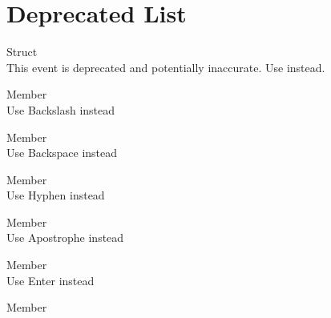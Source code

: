 \chapter{Deprecated List}
\hypertarget{deprecated}{}\label{deprecated}

\begin{DoxyRefList}
\item[Struct \doxylink{structsf_1_1_event_1_1_mouse_wheel_event}{sf\+::Event\+::Mouse\+Wheel\+Event} ]\hfill \\
\label{deprecated__deprecated000018}%
%
This event is deprecated and potentially inaccurate. Use  instead. 
\item[Member \doxylink{classsf_1_1_keyboard_acb4cacd7cc5802dec45724cf3314a142a536df84e73859aa44e11e192459470b6}{sf\+::Keyboard\+::Back\+Slash} ]\hfill \\
\label{deprecated__deprecated000022}%
%
Use Backslash instead  
\item[Member \doxylink{classsf_1_1_keyboard_acb4cacd7cc5802dec45724cf3314a142a33aeaab900abcd01eebf2fcc4f6d97e2}{sf\+::Keyboard\+::Back\+Space} ]\hfill \\
\label{deprecated__deprecated000021}%
%
Use Backspace instead  
\item[Member \doxylink{classsf_1_1_keyboard_acb4cacd7cc5802dec45724cf3314a142a401a183dcfde0a06cb60fe6c91fa1e39}{sf\+::Keyboard\+::Dash} ]\hfill \\
\label{deprecated__deprecated000020}%
%
Use Hyphen instead  
\item[Member \doxylink{classsf_1_1_keyboard_acb4cacd7cc5802dec45724cf3314a142af031edb6bcf319734a6664388958c475}{sf\+::Keyboard\+::Quote} ]\hfill \\
\label{deprecated__deprecated000025}%
%
Use Apostrophe instead  
\item[Member \doxylink{classsf_1_1_keyboard_acb4cacd7cc5802dec45724cf3314a142ac291de81bdee518d636bc359f2ca77de}{sf\+::Keyboard\+::Return} ]\hfill \\
\label{deprecated__deprecated000024}%
%
Use Enter instead  
\item[Member \doxylink{classsf_1_1_keyboard_acb4cacd7cc5802dec45724cf3314a142a460ab09a36f9ed230504b89b9815de88}{sf\+::Keyboard\+::Semi\+Colon} ]\hfill \\

\end{DoxyRefList}
